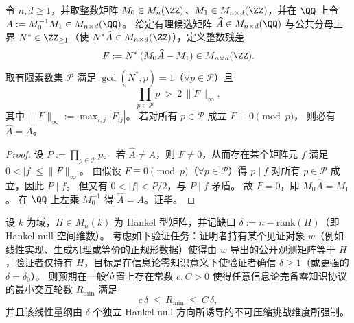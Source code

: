 \begin{proposition}\label{prop:xi-finite-prime-refutation-audit}
令 \(n,d\ge 1\)，并取整数矩阵 \(M_0\in M_n(\ZZ)\)、\(M_1\in M_{n\times d}(\ZZ)\)，并在 \(\QQ\) 上令
\(
A:=M_0^{-1}M_1\in M_{n\times d}(\QQ)
\)。
给定有理候选矩阵 \(\widehat A\in M_{n\times d}(\QQ)\) 与公共分母上界 \(N^\ast\in\ZZ_{\ge 1}\)（使 \(N^\ast\widehat A\in M_{n\times d}(\ZZ)\)），定义整数残差
\[
F:=N^\ast\,(M_0\widehat A-M_1)\in M_{n\times d}(\ZZ).
\]
取有限素数集 \(\mathcal P\) 满足 \(\gcd(N^\ast,p)=1\)（\(\forall p\in\mathcal P\)）且
\[
\prod_{p\in\mathcal P}p\ >\ 2\,\|F\|_\infty,
\]
其中 \(\|F\|_\infty:=\max_{i,j}|F_{ij}|\)。
若对所有 \(p\in\mathcal P\) 成立
\(
F\equiv 0\pmod p
\)，
则必有 \(\widehat A=A\)。
\end{proposition}
\begin{proof}
设 \(P:=\prod_{p\in\mathcal P}p\)。
若 \(\widehat A\neq A\)，则 \(F\neq 0\)，从而存在某个矩阵元 \(f\) 满足 \(0<|f|\le \|F\|_\infty\)。
由假设 \(F\equiv 0\pmod p\)（\(\forall p\in\mathcal P\)）得 \(p\mid f\) 对所有 \(p\in\mathcal P\) 成立，因此 \(P\mid f\)。
但又有 \(0<|f|<P/2\)，与 \(P\mid f\) 矛盾。
故 \(F=0\)，即 \(M_0\widehat A=M_1\)。
在 \(\QQ\) 上左乘 \(M_0^{-1}\) 得 \(\widehat A=A\)。证毕。
\end{proof}

\begin{conjecture}\label{conj:xi-hankel-gap-zk-round-complexity}
设 \(k\) 为域，\(H\in M_n(k)\) 为 Hankel 型矩阵，并记缺口 \(\delta:=n-\mathrm{rank}(H)\)（即 Hankel-null 空间维数）。
考虑如下验证任务：证明者持有某个见证对象 \(w\)（例如线性实现、生成机理或等价的正规形数据）使得由 \(w\) 导出的公开观测矩阵等于 \(H\)，验证者仅持有 \(H\)，目标是在信息论零知识意义下使验证者确信 \(\delta\ge 1\)（或更强的 \(\delta=\delta_0\)）。
则预期在一般位置上存在常数 \(c,C>0\) 使得任意信息论完备零知识协议的最小交互轮数 \(R_{\min}\) 满足
\[
c\,\delta\ \le\ R_{\min}\ \le\ C\,\delta,
\]
并且该线性量纲由 \(\delta\) 个独立 Hankel-null 方向所诱导的不可压缩挑战维度所强制。
\end{conjecture}

\endinput
